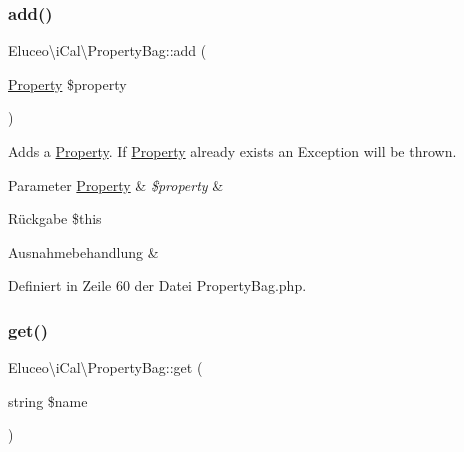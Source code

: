 \subsubsection{\texorpdfstring{add()}{add()}\hspace{0.1cm}{\footnotesize\ttfamily [3/3]}}
{\footnotesize\ttfamily Eluceo\textbackslash{}i\+Cal\textbackslash{}\+Property\+Bag\+::add (\begin{DoxyParamCaption}\item[{\mbox{\hyperlink{class_eluceo_1_1i_cal_1_1_property}{Property}}}]{\$property }\end{DoxyParamCaption})}

Adds a \mbox{\hyperlink{class_eluceo_1_1i_cal_1_1_property}{Property}}. If \mbox{\hyperlink{class_eluceo_1_1i_cal_1_1_property}{Property}} already exists an Exception will be thrown.


\begin{DoxyParams}[1]{Parameter}
\mbox{\hyperlink{class_eluceo_1_1i_cal_1_1_property}{Property}} & {\em \$property} & \\
\hline
\end{DoxyParams}
\begin{DoxyReturn}{Rückgabe}
\$this
\end{DoxyReturn}

\begin{DoxyExceptions}{Ausnahmebehandlung}
{\em } & \\
\hline
\end{DoxyExceptions}


Definiert in Zeile 60 der Datei Property\+Bag.\+php.

\mbox{\label{class_eluceo_1_1i_cal_1_1_property_bag_ab4e772a7ba80e988e259e4daacf50e76}} 
\subsubsection{\texorpdfstring{get()}{get()}\hspace{0.1cm}{\footnotesize\ttfamily [1/3]}}
{\footnotesize\ttfamily Eluceo\textbackslash{}i\+Cal\textbackslash{}\+Property\+Bag\+::get (\begin{DoxyParamCaption}\item[{string}]{\$name }\end{DoxyParamCaption})}


